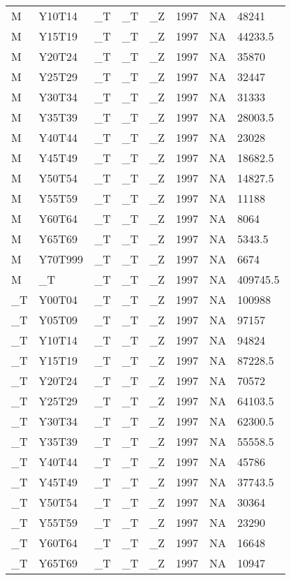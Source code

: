 \begin{longtable}[t]{llllllll}
M & Y10T14 & \_T & \_T & \_Z & 1997 & NA & 48241\\
M & Y15T19 & \_T & \_T & \_Z & 1997 & NA & 44233.5\\
M & Y20T24 & \_T & \_T & \_Z & 1997 & NA & 35870\\
\addlinespace
M & Y25T29 & \_T & \_T & \_Z & 1997 & NA & 32447\\
M & Y30T34 & \_T & \_T & \_Z & 1997 & NA & 31333\\
M & Y35T39 & \_T & \_T & \_Z & 1997 & NA & 28003.5\\
M & Y40T44 & \_T & \_T & \_Z & 1997 & NA & 23028\\
M & Y45T49 & \_T & \_T & \_Z & 1997 & NA & 18682.5\\
\addlinespace
M & Y50T54 & \_T & \_T & \_Z & 1997 & NA & 14827.5\\
M & Y55T59 & \_T & \_T & \_Z & 1997 & NA & 11188\\
M & Y60T64 & \_T & \_T & \_Z & 1997 & NA & 8064\\
M & Y65T69 & \_T & \_T & \_Z & 1997 & NA & 5343.5\\
M & Y70T999 & \_T & \_T & \_Z & 1997 & NA & 6674\\
\addlinespace
M & \_T & \_T & \_T & \_Z & 1997 & NA & 409745.5\\
\_T & Y00T04 & \_T & \_T & \_Z & 1997 & NA & 100988\\
\_T & Y05T09 & \_T & \_T & \_Z & 1997 & NA & 97157\\
\_T & Y10T14 & \_T & \_T & \_Z & 1997 & NA & 94824\\
\_T & Y15T19 & \_T & \_T & \_Z & 1997 & NA & 87228.5\\
\addlinespace
\_T & Y20T24 & \_T & \_T & \_Z & 1997 & NA & 70572\\
\_T & Y25T29 & \_T & \_T & \_Z & 1997 & NA & 64103.5\\
\_T & Y30T34 & \_T & \_T & \_Z & 1997 & NA & 62300.5\\
\_T & Y35T39 & \_T & \_T & \_Z & 1997 & NA & 55558.5\\
\_T & Y40T44 & \_T & \_T & \_Z & 1997 & NA & 45786\\
\addlinespace
\_T & Y45T49 & \_T & \_T & \_Z & 1997 & NA & 37743.5\\
\_T & Y50T54 & \_T & \_T & \_Z & 1997 & NA & 30364\\
\_T & Y55T59 & \_T & \_T & \_Z & 1997 & NA & 23290\\
\_T & Y60T64 & \_T & \_T & \_Z & 1997 & NA & 16648\\
\_T & Y65T69 & \_T & \_T & \_Z & 1997 & NA & 10947\\

\end{longtable}
